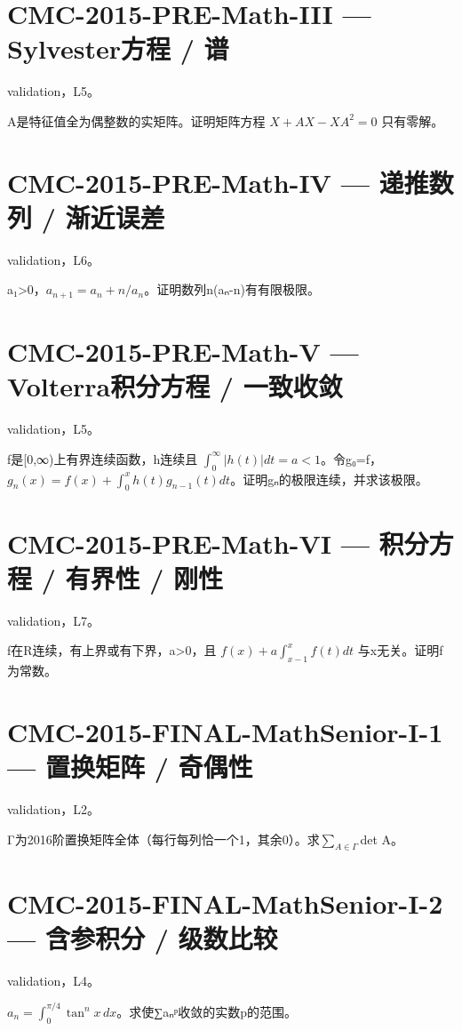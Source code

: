 \documentclass[UTF8]{ctexart}
\begin{document}
\section*{CMC-2015-PRE-Math-III — Sylvester方程 / 谱}

validation，L5。

A是特征值全为偶整数的实矩阵。证明矩阵方程 $X+AX-XA^2=0$ 只有零解。

\section*{CMC-2015-PRE-Math-IV — 递推数列 / 渐近误差}

validation，L6。

a₁>0，$a_{n+1}=a_n+n/a_n$。证明数列n(aₙ-n)有有限极限。

\section*{CMC-2015-PRE-Math-V — Volterra积分方程 / 一致收敛}

validation，L5。

f是[0,∞)上有界连续函数，h连续且 $\int_0^\infty|h(t)|dt=a<1$。令g₀=f，$g_n(x)=f(x)+\int_0^xh(t)g_{n-1}(t)dt$。证明gₙ的极限连续，并求该极限。

\section*{CMC-2015-PRE-Math-VI — 积分方程 / 有界性 / 刚性}

validation，L7。

f在R连续，有上界或有下界，a>0，且 $f(x)+a\int_{x-1}^x f(t)dt$ 与x无关。证明f为常数。

\section*{CMC-2015-FINAL-MathSenior-I-1 — 置换矩阵 / 奇偶性}

validation，L2。

Γ为2016阶置换矩阵全体（每行每列恰一个1，其余0）。求$∑_{A∈Γ}$det A。

\section*{CMC-2015-FINAL-MathSenior-I-2 — 含参积分 / 级数比较}

validation，L4。

$a_n=\int_0^{\pi/4}\tan^n x\,dx$。求使∑aₙᵖ收敛的实数p的范围。
\end{document}
